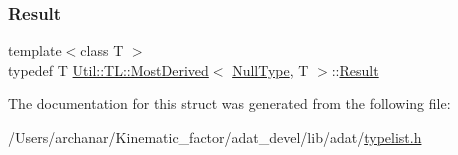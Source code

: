 \mbox{\label{structUtil_1_1TL_1_1MostDerived_3_01NullType_00_01T_01_4_a67aeb01e6a29f0a07798b8626b0d69c2}} 
\subsubsection{\texorpdfstring{Result}{Result}\hspace{0.1cm}{\footnotesize\ttfamily [2/2]}}
{\footnotesize\ttfamily template$<$class T $>$ \\
typedef T \mbox{\hyperlink{structUtil_1_1TL_1_1MostDerived}{Util\+::\+T\+L\+::\+Most\+Derived}}$<$ \mbox{\hyperlink{classUtil_1_1NullType}{Null\+Type}}, T $>$\+::\mbox{\hyperlink{structUtil_1_1TL_1_1MostDerived_3_01NullType_00_01T_01_4_a67aeb01e6a29f0a07798b8626b0d69c2}{Result}}}



The documentation for this struct was generated from the following file\+:\begin{DoxyCompactItemize}
\item 
/\+Users/archanar/\+Kinematic\+\_\+factor/adat\+\_\+devel/lib/adat/\mbox{\hyperlink{lib_2adat_2typelist_8h}{typelist.\+h}}\end{DoxyCompactItemize}

